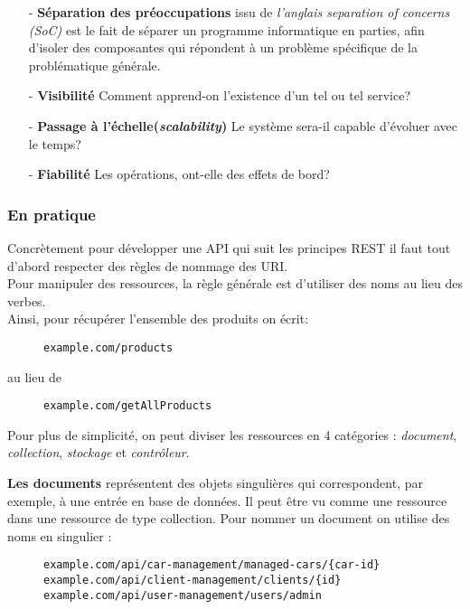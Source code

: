 \begin{itemize}
	\item [- \textbf{Séparation des préoccupations}] issu de \emph{l’anglais separation of concerns (SoC)} est le fait de séparer un programme informatique en parties, afin d'isoler des composantes qui répondent à un problème spécifique de la problématique générale.  
	\item [- \textbf{Visibilité}] Comment apprend-on l'existence d'un tel ou tel service? 
	\item [- \textbf{Passage à l'échelle(\emph{scalability})}] Le système sera-il capable d'évoluer avec le temps?
	\item [- \textbf{Fiabilité}] Les opérations, ont-elle des effets de bord?
\end{itemize}


\subsubsection{En pratique}
Concrètement pour développer une API qui suit les principes REST il faut tout d'abord respecter des règles de nommage des URI. \\
Pour manipuler des ressources, la règle générale est d'utiliser des noms au lieu des verbes.\\
Ainsi, pour récupérer l'ensemble des produits on écrit:
\begin{figure}[h!]
	\begin{lstlisting}[frame=leftline]
example.com/products
	\end{lstlisting}
\end{figure}

au lieu de 


\begin{figure}[h!]
	\begin{lstlisting}[frame=leftline]
example.com/getAllProducts
	\end{lstlisting}
\end{figure}
 
Pour plus de simplicité, on peut diviser les ressources en 4 catégories : \emph{document}, \emph{collection}, \emph{stockage} et \emph{contrôleur}. 

\textbf{Les documents} représentent des objets singulières qui  correspondent, par exemple, à une entrée en base de données. Il peut être vu comme une ressource dans une ressource de type collection. Pour nommer un document on utilise des noms en singulier : 
\begin{figure}[h!]
	\begin{lstlisting}[frame=leftline]
example.com/api/car-management/managed-cars/{car-id}
example.com/api/client-management/clients/{id}
example.com/api/user-management/users/admin
	\end{lstlisting}
\end{figure}

